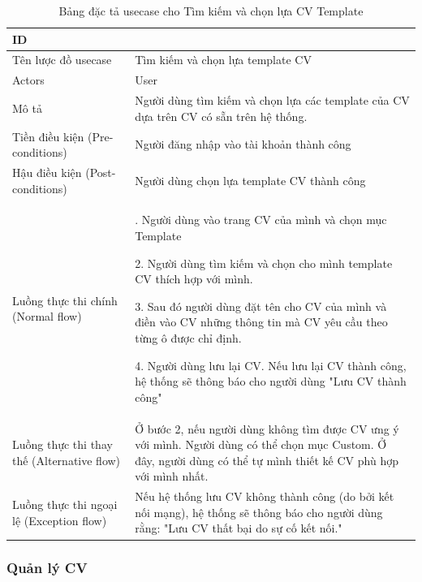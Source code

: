 \begin{table}[H]
    \centering
    \begin{tabular}{|>{\centering\arraybackslash}p{0.3\linewidth}|>{\raggedright\arraybackslash}p{0.7\linewidth}|} \hline 
         ID
& 3\\ \hline 
         
Tên lược đồ usecase
& Tìm kiếm và chọn lựa template CV\\ \hline 
         Actors
& User\\ \hline 
         
Mô tả
& Người dùng tìm kiếm và chọn lựa các template của CV dựa trên CV có sẵn trên hệ thống.\\ \hline 
         Tiền điều kiện (Pre-conditions)
& Người đăng nhập vào tài khoản thành công\\ \hline 
         
Hậu điều kiện (Post-conditions)& Người dùng chọn lựa template CV thành công\\ \hline 
         Luồng thực thi chính (Normal flow)& 1. Người dùng vào trang CV của mình và chọn mục Template

2. Người dùng tìm kiếm và chọn cho mình template CV thích hợp với mình.

3. Sau đó người dùng đặt tên cho CV của mình và điền vào CV những thông tin mà CV yêu cầu theo từng ô được chỉ định.

4. Người dùng lưu lại CV. Nếu lưu lại CV thành công, hệ thống sẽ thông báo cho người dùng "Lưu CV thành công"\\ \hline 
         
Luồng thực thi thay thế (Alternative flow)
& Ở bước 2, nếu người dùng không tìm được CV ưng ý với mình. Người dùng có thể chọn mục Custom. Ở đây, người dùng có thể tự mình thiết kế CV phù hợp với mình nhất.\\ \hline
 Luồng thực thi ngoại lệ (Exception flow)&4.1 Nếu hệ thống lưu CV không thành công (do bởi kết nối mạng), hệ thống sẽ thông báo cho người dùng rằng: "Lưu CV thất bại do sự cố kết nối."\\\hline
    \end{tabular}
    \caption{Bảng đặc tả usecase cho Tìm kiếm và chọn lựa CV Template}
    \label{tab:Tìm kiếm và chọn CV templates}
\end{table}



\subsubsection{Quản lý CV}

